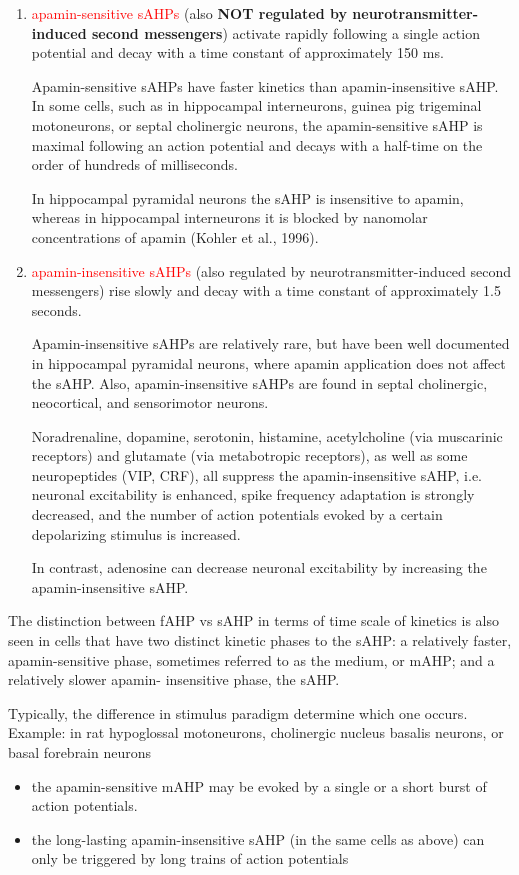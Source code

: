 \begin{enumerate}
  \item  \textcolor{red}{apamin-sensitive sAHPs} (also {\bf NOT regulated by
  neurotransmitter-induced second messengers}) activate rapidly following a
  single action potential and decay with a time constant of approximately 150 ms.

Apamin-sensitive sAHPs have faster kinetics than apamin-insensitive sAHP.
In some cells, such as in hippocampal interneurons, guinea pig trigeminal
motoneurons, or septal  cholinergic  neurons, the  apamin-sensitive 
sAHP  is  maximal  following  an  action potential and decays with a half-time
on the order of hundreds of milliseconds.

In hippocampal pyramidal neurons the sAHP is insensitive to apamin, whereas
in hippocampal interneurons it is blocked by nanomolar concentrations of 
apamin (Kohler et al., 1996). 

  \item  \textcolor{red}{apamin-insensitive sAHPs} (also regulated by
  neurotransmitter-induced second messengers) rise slowly and decay with a time
  constant of approximately 1.5 seconds.

Apamin-insensitive sAHPs are relatively rare, but have been well documented in
hippocampal pyramidal neurons, where apamin application does not affect the
sAHP. Also, apamin-insensitive sAHPs are found in  septal  cholinergic,
neocortical, and  sensorimotor  neurons.

Noradrenaline, dopamine, serotonin, histamine, acetylcholine  (via  muscarinic
receptors)  and  glutamate  (via  metabotropic  receptors),  as well as some
neuropeptides (VIP, CRF), all suppress the apamin-insensitive sAHP, i.e.
neuronal  excitability  is  enhanced,  spike  frequency  adaptation  is 
strongly decreased, and the number of action potentials evoked by a certain
depolarizing stimulus is increased.

In contrast, adenosine can decrease neuronal excitability by increasing the
apamin-insensitive sAHP.

\end{enumerate}

The distinction between fAHP vs sAHP in terms of time scale of kinetics is also
seen in cells that  have  two  distinct  kinetic  phases  to  the  sAHP: a
relatively  faster,  apamin-sensitive phase, sometimes referred to as the
medium, or mAHP; and a relatively slower apamin- insensitive phase, the sAHP.

Typically, the difference in stimulus paradigm determine which one occurs.
Example: in rat hypoglossal motoneurons, cholinergic nucleus basalis neurons, or
basal forebrain neurons
\begin{itemize}
  
  \item the apamin-sensitive mAHP may be evoked by a single or a short burst of
  action potentials.
  
  \item the long-lasting apamin-insensitive sAHP (in the same cells as above)
  can only be triggered by long trains of action potentials
\end{itemize}



